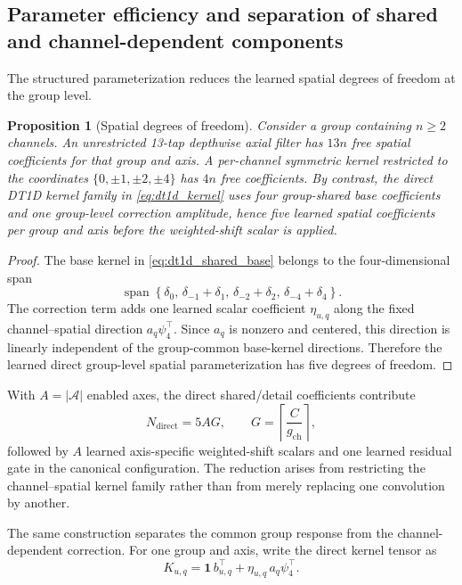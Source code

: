 \documentclass[pdflatex,sn-mathphys-num]{sn-jnl}
\theoremstyle{thmstyleone}
\newtheorem{proposition}[theorem]{Proposition}
\theoremstyle{thmstyletwo}
\theoremstyle{thmstylethree}
\begin{document}
\subsection{Parameter efficiency and separation of shared and channel-dependent components}
\label{subsec:parameter_separation}

The structured parameterization reduces the learned spatial degrees of freedom at the group level.

\begin{proposition}[Spatial degrees of freedom]
\label{prop:dt1d_dof}
Consider a group containing $n\geq2$ channels. An unrestricted 13-tap depthwise axial filter has $13n$ free spatial coefficients for that group and axis. A per-channel symmetric kernel restricted to the coordinates $\{0,\pm1,\pm2,\pm4\}$ has $4n$ free coefficients. By contrast, the direct DT1D kernel family in \eqref{eq:dt1d_kernel} uses four group-shared base coefficients and one group-level correction amplitude, hence five learned spatial coefficients per group and axis before the weighted-shift scalar is applied.
\end{proposition}

\begin{proof}
The base kernel in \eqref{eq:dt1d_shared_base} belongs to the four-dimensional span
\[
\operatorname{span}\!\left\{
\delta_0,\,
\delta_{-1}+\delta_1,\,
\delta_{-2}+\delta_2,\,
\delta_{-4}+\delta_4
\right\}.
\]
The correction term adds one learned scalar coefficient $\eta_{u,q}$ along the fixed channel--spatial direction $a_q\psi_4^{\top}$. Since $a_q$ is nonzero and centered, this direction is linearly independent of the group-common base-kernel directions. Therefore the learned direct group-level spatial parameterization has five degrees of freedom.
\end{proof}

With $A=|\mathcal{A}|$ enabled axes, the direct shared/detail coefficients contribute
\begin{equation}
N_{\mathrm{direct}}=5AG,
\qquad
G=\left\lceil\frac{C}{g_{\mathrm{ch}}}\right\rceil,
\label{eq:dt1d_parameter_count}
\end{equation}
followed by $A$ learned axis-specific weighted-shift scalars and one learned residual gate in the canonical configuration. The reduction arises from restricting the channel--spatial kernel family rather than from merely replacing one convolution by another.

The same construction separates the common group response from the channel-dependent correction. For one group and axis, write the direct kernel tensor as
\begin{equation}
K_{u,q}
=
\mathbf{1}\,b_{u,q}^{\top}
+
\eta_{u,q}\,a_q\psi_4^{\top}.
\end{equation}
\end{document}
